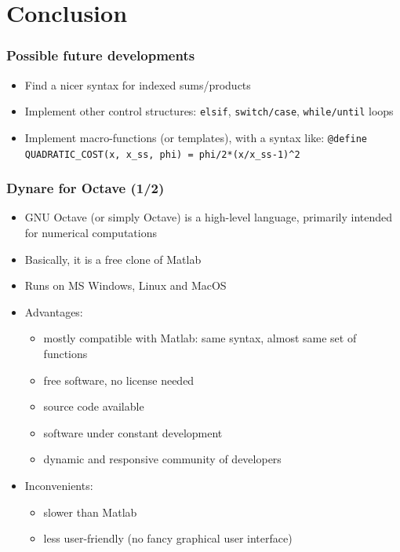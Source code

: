 \documentclass{beamer}
\begin{document}

\section{Conclusion}

\begin{frame}[fragile=singleslide]
  \frametitle{Possible future developments}
  \begin{itemize}
  \item Find a nicer syntax for indexed sums/products
  \item Implement other control structures: \texttt{elsif}, \texttt{switch/case}, \texttt{while/until} loops
  \item Implement macro-functions (or templates), with a syntax like:
    \small
    \verb+@define QUADRATIC_COST(x, x_ss, phi) = phi/2*(x/x_ss-1)^2+
    \normalsize
  \end{itemize}
\end{frame}

\begin{frame}
  \frametitle{Dynare for Octave (1/2)}
  \begin{itemize}
  \item GNU Octave (or simply Octave) is a high-level language, primarily intended for numerical computations
  \item Basically, it is a free clone of Matlab
  \item Runs on MS Windows, Linux and MacOS
  \item Advantages:
    \begin{itemize}
    \item mostly compatible with Matlab: same syntax, almost same set of functions
    \item free software, no license needed
    \item source code available
    \item software under constant development
    \item dynamic and responsive community of developers
    \end{itemize}
  \item Inconvenients:
    \begin{itemize}
    \item slower than Matlab
    \item less user-friendly (no fancy graphical user interface)
    \end{itemize}
  \end{itemize}
\end{frame}
\end{document}

